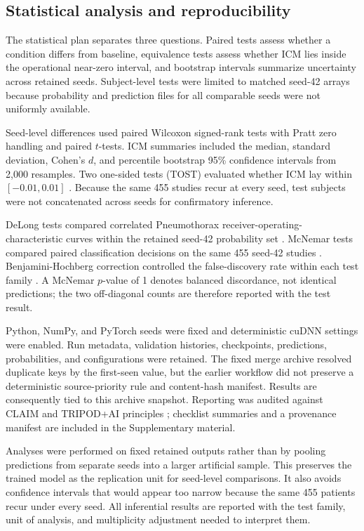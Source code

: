 \documentclass[10pt,a4paper,twocolumn]{article}
\begin{document}
\subsection{Statistical analysis and reproducibility}\label{sec:statistics}

The statistical plan separates three questions. Paired tests assess whether a
condition differs from baseline, equivalence tests assess whether ICM lies
inside the operational near-zero interval, and bootstrap intervals summarize
uncertainty across retained seeds. Subject-level tests were limited to matched
seed-42 arrays because probability and prediction files for all comparable
seeds were not uniformly available.

Seed-level differences used paired Wilcoxon signed-rank tests with Pratt zero
handling and paired $t$-tests. ICM summaries included the median, standard
deviation, Cohen's $d$, and percentile bootstrap 95\% confidence intervals from
2,000 resamples. Two one-sided tests (TOST) evaluated whether ICM lay within
$[-0.01,0.01]$ \cite{lakens2017equivalence}. Because the same 455 studies recur
at every seed, test subjects were not concatenated across seeds for
confirmatory inference.

DeLong tests compared correlated Pneumothorax receiver-operating-characteristic
curves within the retained seed-42 probability set \cite{delong1988roc}.
McNemar tests compared paired classification decisions on the same 455 seed-42
studies \cite{mcnemar1947correlated}. Benjamini-Hochberg correction controlled
the false-discovery rate within each test family
\cite{benjamini1995fdr}. A McNemar $p$-value of 1 denotes balanced discordance,
not identical predictions; the two off-diagonal counts are therefore reported
with the test result.

Python, NumPy, and PyTorch seeds were fixed and deterministic cuDNN settings
were enabled. Run metadata, validation histories, checkpoints, predictions,
probabilities, and configurations were retained. The fixed merge archive
resolved duplicate keys by the first-seen value, but the earlier workflow did
not preserve a deterministic source-priority rule and content-hash manifest.
Results are consequently tied to this archive snapshot. Reporting was audited
against CLAIM and TRIPOD+AI principles
\cite{mongan2024claim,collins2024tripodai}; checklist summaries and a provenance
manifest are included in the Supplementary material.

Analyses were performed on fixed retained outputs rather than by pooling
predictions from separate seeds into a larger artificial sample. This preserves
the trained model as the replication unit for seed-level comparisons. It also
avoids confidence intervals that would appear too narrow because the same 455
patients recur under every seed. All inferential results are reported with the
test family, unit of analysis, and multiplicity adjustment needed to interpret
them.
\end{document}
